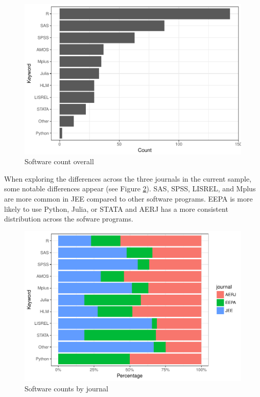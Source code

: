 \documentclass[english,floatsintext,man]{apa6}
\theoremstyle{definition}
\theoremstyle{definition}
\theoremstyle{remark}
\begin{document}
\begin{figure}
\centering
\includegraphics{aera_proposal_files/figure-latex/count-software-1.pdf}
\caption{\label{fig:count-software}Software count overall}
\end{figure}

When exploring the differences across the three journals in the current
sample, some notable differences appear (see Figure
\ref{fig:software-journal}). SAS, SPSS, LISREL, and Mplus are more
common in JEE compared to other software programs. EEPA is more likely
to use Python, Julia, or STATA and AERJ has a more consistent
distribution across the sofware programs.

\begin{figure}
\centering
\includegraphics{aera_proposal_files/figure-latex/software-journal-1.pdf}
\caption{\label{fig:software-journal}Software counts by journal}
\end{figure}
\end{document}
